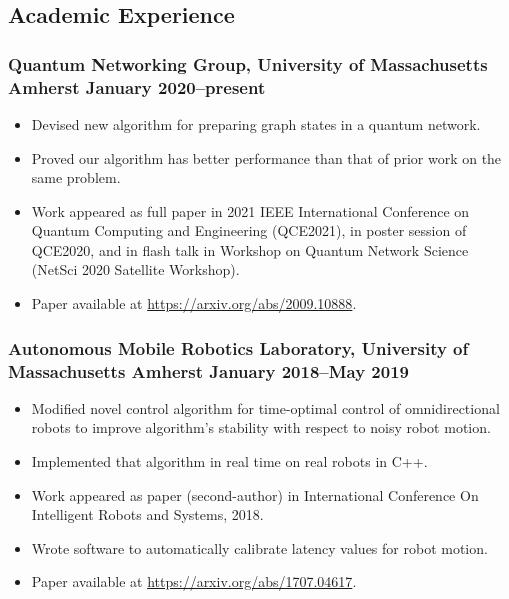 \documentclass{article}
\begin{document}
	\subsection*{Academic Experience}
		\subsubsection*{Quantum Networking Group, University of Massachusetts Amherst \hfill \normalfont \normalsize January 2020--present}
			\begin{itemize}[noitemsep,leftmargin=40pt]
				\item Devised new algorithm for preparing graph states in a quantum network.
				\item Proved our algorithm has better performance than that of prior work on the same problem.
				\item Work appeared as full paper in 2021 IEEE International Conference on Quantum Computing and Engineering (QCE2021), in poster session of QCE2020, and in flash talk in Workshop on Quantum Network Science (NetSci 2020 Satellite Workshop).
				\item Paper available at \href{https://arxiv.org/abs/2009.10888}{https://arxiv.org/abs/2009.10888}.
			\end{itemize}
		\subsubsection*{Autonomous Mobile Robotics Laboratory, University of Massachusetts Amherst \hfill \normalfont \normalsize January 2018--May 2019}
			\begin{itemize}[noitemsep,leftmargin=40pt]
				\item Modified novel control algorithm for time-optimal control of omnidirectional robots to improve algorithm's stability with respect to noisy robot motion.
				\item Implemented that algorithm in real time on real robots in C++.
				\item Work appeared as paper (second-author) in International Conference On Intelligent Robots and Systems, 2018.
				\item Wrote software to automatically calibrate latency values for robot motion.
				\item Paper available at \href{https://arxiv.org/abs/1707.04617}{https://arxiv.org/abs/1707.04617}.
			\end{itemize}
\end{document}
